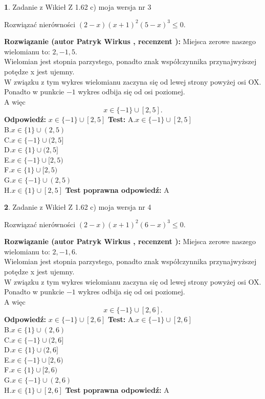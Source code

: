 \documentclass[12pt, a4paper]{article}
\theoremstyle{definition} %
\newtheorem{zad}{}
\newcommand{\zadStart}[1]{\begin{zad}#1\newline}
\newcommand{\zadStop}{\end{zad}}
\newcommand{\rozwStart}[2]{\noindent \textbf{Rozwiązanie (autor #1 , recenzent #2): }\newline}
\newcommand{\rozwStop}{\newline}
\newcommand{\odpStart}{\noindent \textbf{Odpowiedź:}\newline}
\newcommand{\odpStop}{\newline}
\newcommand{\testStart}{\noindent \textbf{Test:}\newline}
\newcommand{\testStop}{\newline}
\newcommand{\kluczStart}{\noindent \textbf{Test poprawna odpowiedź:}\newline}
\newcommand{\kluczStop}{\newline}
\begin{document}
\zadStart{Zadanie z Wikieł Z 1.62 c) moja wersja nr 3}

Rozwiązać nierówności $(2-x)(x+1)^{2}(5-x)^{3}\le0$.
\zadStop
\rozwStart{Patryk Wirkus}{}
Miejsca zerowe naszego wielomianu to: $2, -1, 5$.\\
Wielomian jest stopnia parzystego, ponadto znak współczynnika przy\linebreak najwyższej potędze x jest ujemny.\\ W związku z tym wykres wielomianu zaczyna się od lewej strony powyżej osi OX.\\
Ponadto w punkcie $-1$ wykres odbija się od osi poziomej.\\
A więc $$x \in \{-1\} \cup [2,5].$$
\rozwStop
\odpStart
$x \in \{-1\} \cup [2,5]$
\odpStop
\testStart
A.$x \in \{-1\} \cup [2,5]$\\
B.$x \in \{1\} \cup (2,5)$\\
C.$x \in \{-1\} \cup (2,5]$\\
D.$x \in \{1\} \cup (2,5]$\\
E.$x \in \{-1\} \cup [2,5)$\\
F.$x \in \{1\} \cup [2,5)$\\
G.$x \in \{-1\} \cup (2,5)$\\
H.$x \in \{1\} \cup [2,5]$
\testStop
\kluczStart
A
\kluczStop



\zadStart{Zadanie z Wikieł Z 1.62 c) moja wersja nr 4}

Rozwiązać nierówności $(2-x)(x+1)^{2}(6-x)^{3}\le0$.
\zadStop
\rozwStart{Patryk Wirkus}{}
Miejsca zerowe naszego wielomianu to: $2, -1, 6$.\\
Wielomian jest stopnia parzystego, ponadto znak współczynnika przy\linebreak najwyższej potędze x jest ujemny.\\ W związku z tym wykres wielomianu zaczyna się od lewej strony powyżej osi OX.\\
Ponadto w punkcie $-1$ wykres odbija się od osi poziomej.\\
A więc $$x \in \{-1\} \cup [2,6].$$
\rozwStop
\odpStart
$x \in \{-1\} \cup [2,6]$
\odpStop
\testStart
A.$x \in \{-1\} \cup [2,6]$\\
B.$x \in \{1\} \cup (2,6)$\\
C.$x \in \{-1\} \cup (2,6]$\\
D.$x \in \{1\} \cup (2,6]$\\
E.$x \in \{-1\} \cup [2,6)$\\
F.$x \in \{1\} \cup [2,6)$\\
G.$x \in \{-1\} \cup (2,6)$\\
H.$x \in \{1\} \cup [2,6]$
\testStop
\kluczStart
A
\kluczStop
\end{document}
